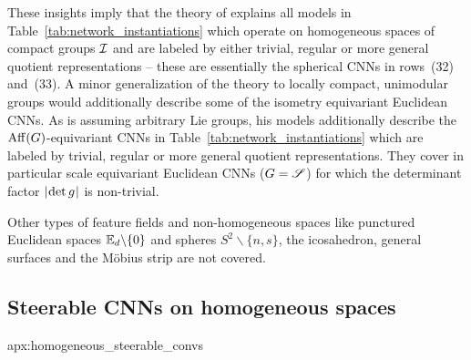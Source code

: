 These insights imply that the theory of \citet{Kondor2018-GENERAL} explains all models in Table~\ref{tab:network_instantiations} which operate on homogeneous spaces of compact groups $\mathcal{I}$ and are labeled by either trivial, regular or more general quotient representations -- these are essentially the spherical CNNs in rows~(32) and~(33).
A minor generalization of the theory to locally compact, unimodular groups would additionally describe some of the isometry equivariant Euclidean CNNs.
As \citet{bekkers2020bspline} is assuming arbitrary Lie groups, his models additionally describe the $\operatorname{Aff}(G)$-equivariant CNNs in Table~\ref{tab:network_instantiations} which are labeled by trivial, regular or more general quotient representations.
They cover in particular scale equivariant Euclidean CNNs ($G=\mathscr{S}$) for which the determinant factor $|\mkern-2mu \det g \mkern1mu|$ is non-trivial.


Other types of feature fields and non-homogeneous spaces like punctured Euclidean spaces $\mathbb{E}_d\backslash\{0\}$ and spheres $S^2\backslash\{n,s\}$, the icosahedron, general surfaces and the M\"obius strip are not covered.














\toclesslab\subsection{Steerable CNNs on homogeneous spaces}{apx:homogeneous_steerable_convs}

